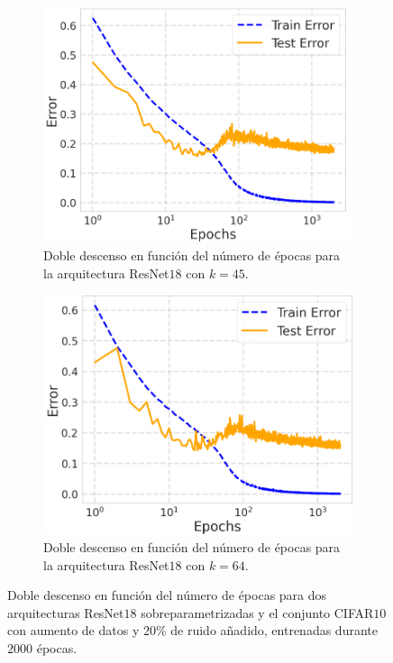 \begin{figure}[h]
    \centering
    \begin{subfigure}[b]{0.48\textwidth}
        \centering
        \includegraphics[width=\textwidth]{img/experiments/PreActResNet18(45).png}
        \caption{Doble descenso en función del número de épocas para la arquitectura ResNet$18$ con $k = 45$.}\label{fig:PreActResNet18(45)}
    \end{subfigure}
    \hfill
    \begin{subfigure}[b]{0.48\textwidth}
        \centering
        \includegraphics[width=\textwidth]{img/experiments/PreActResNet18(64).png}
        \caption{Doble descenso en función del número de épocas para la arquitectura ResNet$18$ con $k = 64$.}\label{fig:PreActResNet18(64)}
    \end{subfigure}
    \caption[Doble descenso en función del número de épocas para dos arquitecturas ResNet$18$ sobreparametrizadas y el conjunto CIFAR$10$.]{Doble descenso en función del número de épocas para dos arquitecturas ResNet$18$ sobreparametrizadas y el conjunto CIFAR$10$ con aumento de datos y $20\%$ de ruido añadido, entrenadas durante $2000$ épocas.}\label{fig:epoch-wisePreActResNet18over}
\end{figure}

